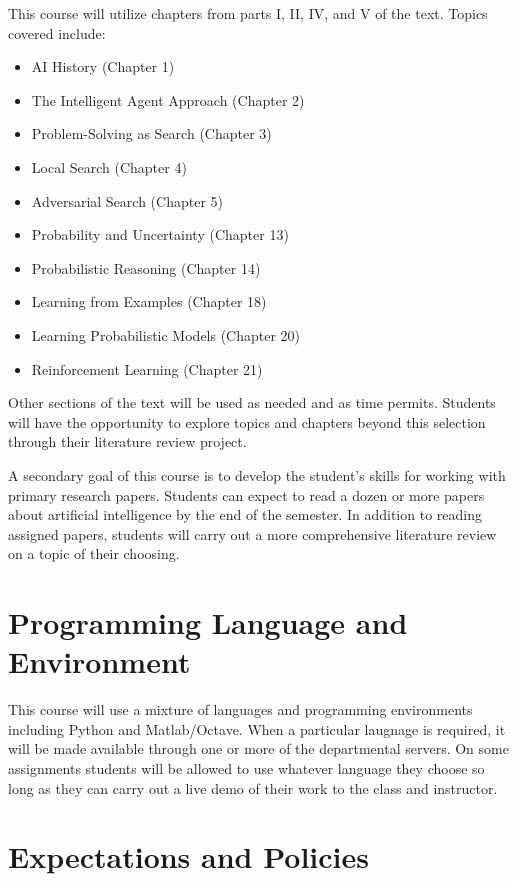 \documentclass[10pt]{article}
\begin{document}
This course will utilize chapters from parts I, II, IV, and V of the text. Topics covered include:
\begin{itemize}
\item AI History (Chapter 1) %
\item The Intelligent Agent Approach (Chapter 2) %
\item Problem-Solving as Search (Chapter 3) %
\item Local Search (Chapter 4) %
\item Adversarial Search (Chapter 5) %
\item Probability and Uncertainty (Chapter 13) %
\item Probabilistic Reasoning (Chapter 14) %
\item Learning from Examples (Chapter 18) %
\item Learning Probabilistic Models (Chapter 20) %
\item Reinforcement Learning (Chapter 21) %
\end{itemize}
Other sections of the text will be used as needed and as time permits.  Students will have the opportunity to explore topics and chapters beyond this selection through their literature review project.

A secondary goal of this course is to develop the student's skills for working with primary research papers.  Students can expect to read a dozen or more papers about artificial intelligence by the end of the semester. In addition to reading assigned papers, students will carry out a more comprehensive literature review on a topic of their choosing.

\section{Programming Language and Environment}

This course will use a mixture of languages and programming environments including Python and Matlab/Octave. When a particular laugnage is required, it will be made available through one or more of the departmental servers. On some assignments students will be allowed to use whatever language they choose so long as they can carry out a live demo of their work to the class and instructor.


\section{Expectations and Policies}
\end{document}
